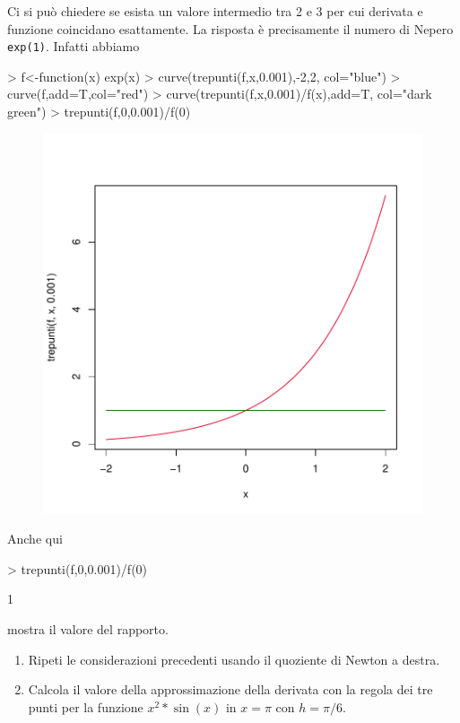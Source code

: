 \documentclass[onecolumn,11pt]{book}
\begin{document}
Ci si pu\`o chiedere se esista un valore intermedio tra 2 e 3 per cui derivata e funzione coincidano esattamente. La risposta \`e precisamente il numero di Nepero \texttt{exp(1)}. Infatti abbiamo
\begin{Schunk}
\begin{Sinput}
>  f<-function(x) exp(x)
>  curve(trepunti(f,x,0.001),-2,2, col="blue")
>  curve(f,add=T,col="red")
>  curve(trepunti(f,x,0.001)/f(x),add=T, col="dark green")
>  trepunti(f,0,0.001)/f(0)
\end{Sinput}
\end{Schunk}

\begin{figure}
\begin{center}
\includegraphics{Rmatematica-124}
\end{center}
\end{figure}

Anche qui
\begin{Schunk}
\begin{Sinput}
> trepunti(f,0,0.001)/f(0)
\end{Sinput}
\begin{Soutput}
[1] 1
\end{Soutput}
\end{Schunk}
mostra il valore del rapporto.

\begin{shaded}
\begin{enumerate}
 \item{ }Ripeti le considerazioni precedenti usando il quoziente di Newton a destra.
\item{} Calcola il valore della approssimazione della derivata con la regola dei tre punti per la funzione $x^2*\sin(x)$ in $x=\pi$ con $h=\pi/6$.
\end{enumerate}
\end{shaded}  
\end{document}
